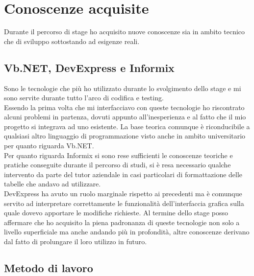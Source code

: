 \section{Conoscenze acquisite}

Durante il percorso di stage ho acquisito nuove conoscenze sia in ambito tecnico che di sviluppo sottostando ad esigenze reali. 

\subsection{Vb.NET, DevExpress e Informix}

Sono le tecnologie che più ho utilizzato durante lo svolgimento dello stage e mi sono servite durante tutto l'arco di codifica e testing.\\
Essendo la prima volta che mi interfacciavo con queste tecnologie ho riscontrato alcuni problemi in partenza, dovuti appunto all'inesperienza e al fatto che il mio 
progetto si integrava ad uno esistente. La base teorica comunque è riconducibile a qualsiasi altro linguaggio di programmazione visto anche in ambito universitario
per quanto riguarda Vb.NET. \\Per quanto riguarda Informix si sono rese sufficienti le conoscenze teoriche e pratiche conseguite durante il percorso di studi, si è resa
necessario qualche intervento da parte del tutor aziendale in casi particolari di formattazione delle tabelle che andavo ad utilizzare.\\
DevExpress ha avuto un ruolo marginale rispetto ai precedenti ma è comunque servito ad interpretare correttamente le funzionalità dell'interfaccia grafica sulla quale dovevo
apportare le modifiche richieste. Al termine dello stage posso affermare che ho acquisito la piena padronanza di queste tecnologie non solo a livello superficiale ma anche
andando più in profondità, altre conoscenze derivano dal fatto di prolungare il loro utilizzo in futuro.\\

\subsection{Metodo di lavoro}

